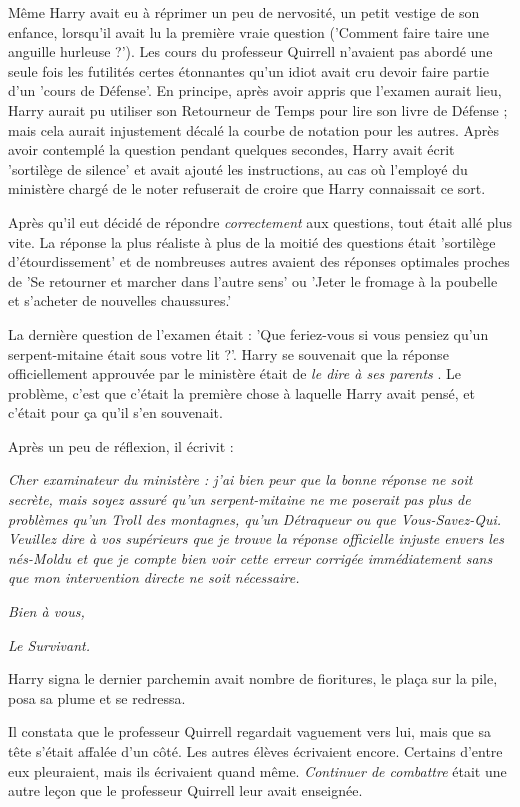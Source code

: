 Même Harry avait eu à réprimer un peu de nervosité, un petit vestige de son enfance, lorsqu'il avait lu la première vraie question ('Comment faire taire une anguille hurleuse ?'). Les cours du professeur Quirrell n'avaient pas abordé une seule fois les futilités certes étonnantes qu'un idiot avait cru devoir faire partie d'un 'cours de Défense'. En principe, après avoir appris que l'examen aurait lieu, Harry aurait pu utiliser son Retourneur de Temps pour lire son livre de Défense ; mais cela aurait injustement décalé la courbe de notation pour les autres. Après avoir contemplé la question pendant quelques secondes, Harry avait écrit 'sortilège de silence' et avait ajouté les instructions, au cas où l'employé du ministère chargé de le noter refuserait de croire que Harry connaissait ce sort.

Après qu'il eut décidé de répondre \emph{correctement}  aux questions, tout était allé plus vite. La réponse la plus réaliste à plus de la moitié des questions était 'sortilège d'étourdissement' et de nombreuses autres avaient des réponses optimales proches de 'Se retourner et marcher dans l'autre sens' ou 'Jeter le fromage à la poubelle et s'acheter de nouvelles chaussures.'

La dernière question de l'examen était : 'Que feriez-vous si vous pensiez qu'un serpent-mitaine était sous votre lit ?'. Harry se souvenait que la réponse officiellement approuvée par le ministère était de \emph{le dire à ses parents} . Le problème, c'est que c'était la première chose à laquelle Harry avait pensé, et c'était pour ça qu'il s'en souvenait.

Après un peu de réflexion, il écrivit :

\emph{Cher examinateur du ministère : j'ai bien peur que la bonne réponse ne soit secrète, mais soyez assuré qu'un serpent-mitaine ne me poserait pas plus de problèmes qu'un Troll des montagnes, qu'un Détraqueur ou que Vous-Savez-Qui. Veuillez dire à vos supérieurs que je trouve la réponse officielle injuste envers les nés-Moldu et que je compte bien voir cette erreur corrigée immédiatement sans que mon intervention directe ne soit nécessaire.} 

\emph{Bien à vous,} 

\emph{Le Survivant.} 

Harry signa le dernier parchemin avait nombre de fioritures, le plaça sur la pile, posa sa plume et se redressa.

Il constata que le professeur Quirrell regardait vaguement vers lui, mais que sa tête s'était affalée d'un côté. Les autres élèves écrivaient encore. Certains d'entre eux pleuraient, mais ils écrivaient quand même. \emph{Continuer de combattre}  était une autre leçon que le professeur Quirrell leur avait enseignée.

